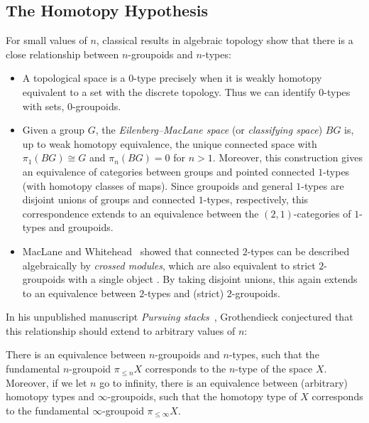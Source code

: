 \documentclass[a4paper,12pt]{article}
\begin{document}
\subsection{The Homotopy Hypothesis}\label{subsec:hohyp}
For small values of $n$, classical results in algebraic topology show
that there is a close relationship between $n$-groupoids and
$n$-types:
\begin{itemize}
\item A topological space is a $0$-type precisely when it is weakly
  homotopy equivalent to a set with the discrete topology. Thus we can
  identify $0$-types with sets, \ie{} $0$-groupoids.
\item Given a group $G$, the \emph{Eilenberg--MacLane space}
  \cite{EML} (or
  \emph{classifying space}) $BG$ is, up to weak homotopy
  equivalence, the unique connected space with $\pi_{1}(BG) \cong G$
  and $\pi_{n}(BG) = 0$ for $n > 1$. Moreover, this construction gives
  an equivalence of categories between groups and pointed connected
  $1$-types (with homotopy classes of maps). Since groupoids and
  general $1$-types are disjoint unions of groups and connected $1$-types,
  respectively, this correspondence extends to an equivalence between
  the $(2,1)$-categories of $1$-types and groupoids.
\item MacLane and Whitehead~\cite{MacLaneWhitehead} showed that
  connected $2$-types can be described algebraically by \emph{crossed
    modules}, which are also equivalent to strict $2$-groupoids with a
  single object \cite{BrownSpencer}. By taking disjoint unions, this
  again extends to an equivalence between $2$-types and (strict)
  $2$-groupoids.
\end{itemize}
In his unpublished manuscript \emph{Pursuing stacks}~\cite{GrothendieckStacks}, Grothendieck conjectured that this
relationship should extend to arbitrary values of $n$:
\begin{conjecture}
  There is an equivalence between $n$-groupoids and $n$-types, such
  that the fundamental $n$-groupoid $\pi_{\leq n}X$ corresponds to the
  $n$-type of the space $X$. Moreover, if we let $n$ go to infinity,
  there is an equivalence between (arbitrary) homotopy types and
  $\infty$-groupoids, such that the homotopy type of $X$ corresponds
  to the fundamental $\infty$-groupoid $\pi_{\leq \infty}X$.
\end{conjecture}
\end{document}
